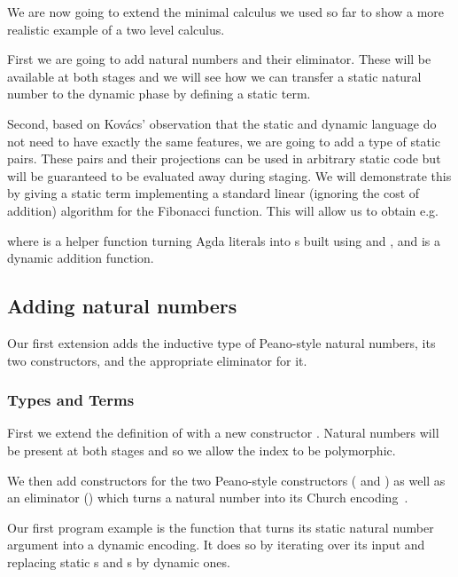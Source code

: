 We are now going to extend the minimal calculus we used so far to
show a more realistic example of a two level calculus.

First we are going to add natural numbers and their eliminator.
These will be available at both stages and we will see how we
can transfer a static natural number to the dynamic phase by
defining a static  term.

Second, based on Kov{\'{a}}cs' observation that the static and
dynamic language do not need to have exactly the same features,
we are going to add a type of static pairs.
%
These pairs and their projections can be used in arbitrary static
code but will be guaranteed to be evaluated away during staging.
%
We will demonstrate this by giving a static term 
implementing a standard linear (ignoring the cost of addition)
algorithm for the Fibonacci function.
%
This will allow us to obtain e.g.


\noindent where  is a helper function turning Agda
literals into s built using  and ,
and  is a dynamic addition function.

\subsection{Adding natural numbers}

Our first extension adds the inductive type of Peano-style natural numbers,
its two constructors, and the appropriate eliminator for it.

\subsubsection{Types and Terms}

First we extend the definition of  with a new constructor
. Natural numbers will be present at both stages and so we
allow the index to be polymorphic.


We then add  constructors for the two Peano-style
constructors ( and ) as well as an
eliminator () which turns a natural number into
its Church encoding~\cite[Chapter 3]{church1941calculi}.


Our first program example is the function  that
turns its static natural number argument into a dynamic
encoding. It does so by iterating over its input and replacing
static s and s by dynamic ones.

